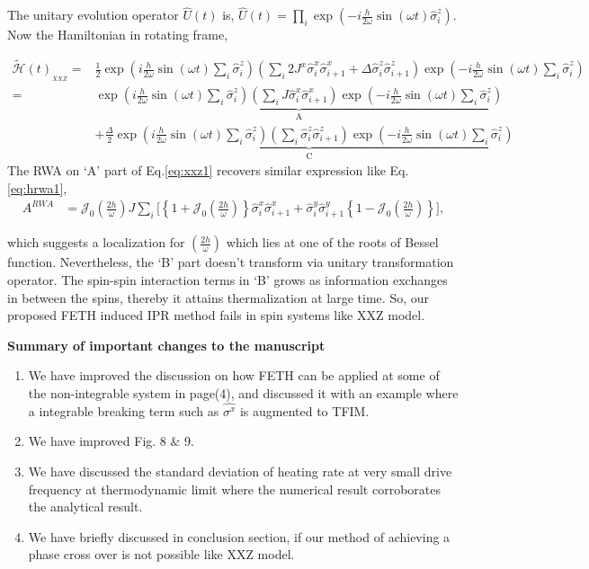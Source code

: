 \documentclass[aps,prb,reprint,showpacs,floatfix,superscriptaddress, onecolumn, nofootinbib, 9pt]{revtex4-2}
\begin{document}
\begin{enumerate}
{The unitary evolution operator $\displaystyle \hat{U}(t)$ is, $\hat{U}(t)=\prod_{i} \exp \left(-i \frac{h}{2 \omega} \sin (\omega t) \hat{\sigma}_{i}^{z}\right)$. Now the Hamiltonian in rotating frame,

\begin{align}
	\tilde{\mathcal{H}}(t)_{_{XXZ}}= & \frac{1}{2} \exp \left(i \frac{h}{2 \omega} \sin (\omega t) \sum_{i} \hat{\sigma}_{i}^{z}\right)\left(\sum_{i} 2J^x \hat{\sigma}^x_i \hat{\sigma}^x_{i+1} + \Delta  \hat{\sigma}^z_i \hat{\sigma}^z_{i+1}\right) \exp \left(-i \frac{h}{2 \omega} \sin (\omega t) \sum_i\hat{\sigma}_{i}^{z}\right) \nonumber\\
	= & \underbrace{\exp \left(i \frac{h}{2 \omega} \sin (\omega t) \sum_{i} \hat{\sigma}_{i}^{z}\right)\left(\sum_{i} J \hat{\sigma}_{i}^{x} \hat{\sigma}_{i+1}^{x}\right) \exp \left(-i \frac{h}{2 \omega} \sin (\omega t) \sum_i\hat{\sigma}_{i}^{z}\right)}_{\mathrm{A}} \nonumber\\
	& +\underbrace{\frac{\Delta}{2} \exp \left(i \frac{h}{2 \omega} \sin (\omega t) \sum_{i} \hat{\sigma}_{i}^{z}\right)\left(\sum_{i}  \hat{\sigma}_{i}^{z} \hat{\sigma}_{i+1}^{z}\right) \exp \left(-i \frac{h}{2 \omega} \sin (\omega t) \sum_i\hat{\sigma}_{i}^{z}\right)}_{\mathrm{C}}
\label{eq:xxz1}
\end{align}
The RWA on `A' part of Eq.\eqref{eq:xxz1} recovers similar expression like  Eq.\eqref{eq:hrwa1},
\begin{align}
	A^{R W A}&= \mathcal{J}_0\left(\frac{2h}{\omega}\right)J\sum_{i}\Bigg[\left\{1+ \mathcal{J}_0\left(\frac{2h}{\omega}\right)\right\} \hat{\sigma}_{i}^{x} \hat{\sigma}_{i+1}^{x} + \hat{\sigma}^y_i\hat{\sigma}^y_{i+1}\left\{1- \mathcal{J}_0\left(\frac{2h}{\omega}\right)\right\} \Bigg],
\end{align}

which suggests a localization for $\left(\frac{2h}{\omega}\right)$ which lies at one of the roots of Bessel function. Nevertheless, the `B' part doesn't transform via unitary transformation operator. The spin-spin interaction terms in `B' grows as information exchanges in between the spins, thereby it attains thermalization at large time. So, our proposed FETH induced IPR method fails in spin systems like XXZ model.
}
\end{enumerate}
\vskip 1cm 
\noindent \textbf{Summary of important changes to the  manuscript}


\begin{enumerate}
\item We have improved the discussion on how FETH can be applied at some of the non-integrable system in page(4), and discussed it with an example where a integrable breaking term such as $\hat{\sigma^x}$ is augmented to TFIM.
\item We have improved Fig. 8 $\&$ 9.
\item We have discussed the standard deviation of heating rate at very small drive frequency at thermodynamic limit where the numerical result corroborates the analytical result.
\item We have briefly discussed in conclusion section, if our method of achieving a phase cross over is not possible like XXZ model. 
\end{enumerate}


\end{document}

